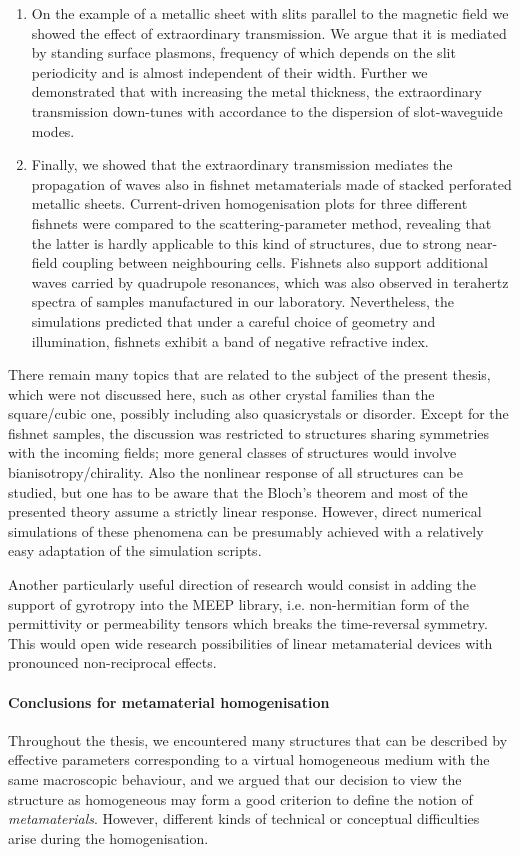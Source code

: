 \begin{enumerate}
{} 
\item{On the example of a metallic sheet with slits parallel to the magnetic field we showed the effect of extraordinary transmission. We argue that it is mediated by standing surface plasmons,  frequency of which depends on the slit periodicity and is almost independent of their width. Further we demonstrated that with increasing the metal thickness, the extraordinary transmission down-tunes with accordance to the dispersion of slot-waveguide modes.
} 
\item{Finally, we showed that the extraordinary transmission mediates the propagation of waves also in fishnet metamaterials made of stacked perforated metallic sheets. Current-driven homogenisation plots for three different fishnets were compared to the scattering-parameter method, revealing that the latter is hardly applicable to this kind of structures, due to strong near-field coupling between neighbouring cells. Fishnets also support additional waves carried by quadrupole resonances, which was also observed in terahertz spectra of samples manufactured in our laboratory. Nevertheless, the simulations predicted that under a careful choice of geometry and illumination, fishnets exhibit a band of negative refractive index. 
}
\end{enumerate}
There remain many topics that are related to the subject of the present thesis, which were not discussed here, such as other crystal families than the square/cubic one, possibly including also quasicrystals or disorder. Except for the fishnet samples, the discussion was restricted to structures sharing symmetries with the incoming fields; more general classes of structures would involve bianisotropy/chirality. Also the nonlinear response of all structures can be studied, but one has to be aware that the Bloch's theorem and most of the presented theory assume a strictly linear response. However, direct numerical simulations of these phenomena can be presumably  achieved with a relatively easy adaptation of the simulation scripts.

Another particularly useful direction of research would consist in adding the support of gyrotropy into the MEEP library, i.e. non-hermitian form of the permittivity or permeability tensors which breaks the time-reversal symmetry. This would open wide research possibilities of linear metamaterial devices with pronounced non-reciprocal effects.

\paragraph{Conclusions for metamaterial homogenisation}
Throughout the thesis, we encountered many structures that can be described by effective parameters corresponding to a virtual homogeneous medium with the same macroscopic behaviour, and we argued that our decision to view the structure as homogeneous may form a good criterion to define the notion of \textit{metamaterials}. However, different kinds of technical or conceptual difficulties arise during the homogenisation.

